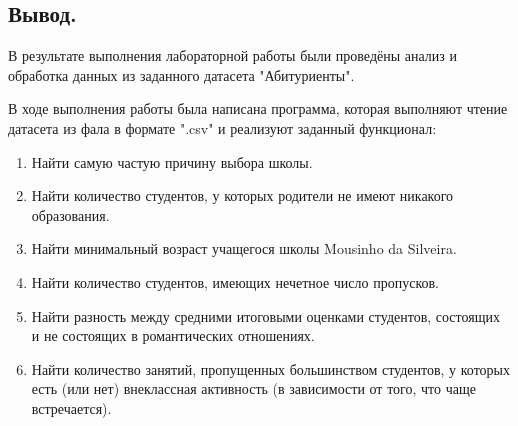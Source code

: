 \documentclass[a4paper]{article}
\begin{document}

\newpage
\begin{center}
\hfill \break
\section{Вывод.}
\end{center} 
\normalsize{
    В результате выполнения лабораторной работы были проведёны анализ и обработка данных из заданного датасета "Абитуриенты".
    
    В ходе выполнения работы была написана программа, которая выполняют чтение датасета из фала в формате ".csv" и реализуют заданный функционал:
    \begin{enumerate}
        \item Найти самую частую причину выбора школы.
        \item Найти количество студентов, у которых родители не имеют никакого образования.
        \item Найти минимальный возраст учащегося школы Mousinho da Silveira.
        \item Найти количество студентов, имеющих нечетное число пропусков.
        \item Найти разность между средними итоговыми оценками студентов, состоящих и не состоящих в романтических отношениях.
        \item Найти количество занятий, пропущенных большинством студентов, у которых есть (или нет) внеклассная активность (в зависимости от того, что чаще встречается).
    \end{enumerate}
}
\end{document}
